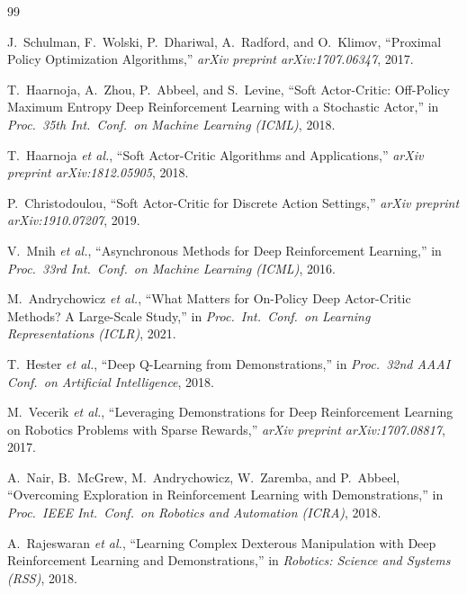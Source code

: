 \begin{thebibliography}{99}

J.~Schulman, F.~Wolski, P.~Dhariwal, A.~Radford, and O.~Klimov,
``Proximal Policy Optimization Algorithms,''
\emph{arXiv preprint arXiv:1707.06347}, 2017.

T.~Haarnoja, A.~Zhou, P.~Abbeel, and S.~Levine,
``Soft Actor-Critic: Off-Policy Maximum Entropy Deep Reinforcement Learning
with a Stochastic Actor,''
in \emph{Proc.\ 35th Int.\ Conf.\ on Machine Learning (ICML)}, 2018.

T.~Haarnoja \emph{et al.},
``Soft Actor-Critic Algorithms and Applications,''
\emph{arXiv preprint arXiv:1812.05905}, 2018.

P.~Christodoulou,
``Soft Actor-Critic for Discrete Action Settings,''
\emph{arXiv preprint arXiv:1910.07207}, 2019.

V.~Mnih \emph{et al.},
``Asynchronous Methods for Deep Reinforcement Learning,''
in \emph{Proc.\ 33rd Int.\ Conf.\ on Machine Learning (ICML)}, 2016.

M.~Andrychowicz \emph{et al.},
``What Matters for On-Policy Deep Actor-Critic Methods? A Large-Scale
Study,''
in \emph{Proc.\ Int.\ Conf.\ on Learning Representations (ICLR)}, 2021.


T.~Hester \emph{et al.},
``Deep Q-Learning from Demonstrations,''
in \emph{Proc.\ 32nd AAAI Conf.\ on Artificial Intelligence}, 2018.

M.~Vecerik \emph{et al.},
``Leveraging Demonstrations for Deep Reinforcement Learning on Robotics
Problems with Sparse Rewards,''
\emph{arXiv preprint arXiv:1707.08817}, 2017.

A.~Nair, B.~McGrew, M.~Andrychowicz, W.~Zaremba, and P.~Abbeel,
``Overcoming Exploration in Reinforcement Learning with Demonstrations,''
in \emph{Proc.\ IEEE Int.\ Conf.\ on Robotics and Automation (ICRA)}, 2018.

A.~Rajeswaran \emph{et al.},
``Learning Complex Dexterous Manipulation with Deep Reinforcement Learning
and Demonstrations,''
in \emph{Robotics: Science and Systems (RSS)}, 2018.


\end{thebibliography}
